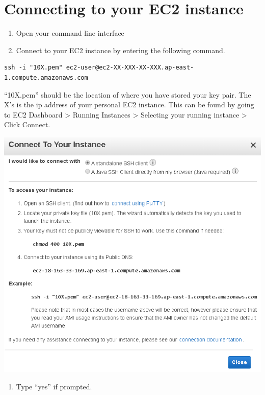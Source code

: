 \documentclass[]{book}
\providecommand{\tightlist}{%
  \setlength{\itemsep}{0pt}\setlength{\parskip}{0pt}}
\begin{document}
\hypertarget{connecting-to-your-ec2-instance}{%
\section{Connecting to your EC2 instance}\label{connecting-to-your-ec2-instance}}

\begin{enumerate}
\def\labelenumi{\arabic{enumi}.}
\item
  Open your command line interface
\item
  Connect to your EC2 instance by entering the following command.
\end{enumerate}

\begin{verbatim}
ssh -i "10X.pem" ec2-user@ec2-XX-XXX-XX-XXX.ap-east-1.compute.amazonaws.com
\end{verbatim}

``10X.pem'' should be the location of where you have stored your key pair. The X's is the ip address of your personal EC2 instance. This can be found by going to EC2 Dashboard \textgreater{} Running Instances \textgreater{} Selecting your running instance \textgreater{} Click Connect.

\includegraphics[width=6.83in]{_book/10X_files/figure-html/ec2}

\begin{enumerate}
\def\labelenumi{\arabic{enumi}.}
\setcounter{enumi}{2}
\tightlist
\item
  Type ``yes'' if prompted.
\end{enumerate}
\end{document}
